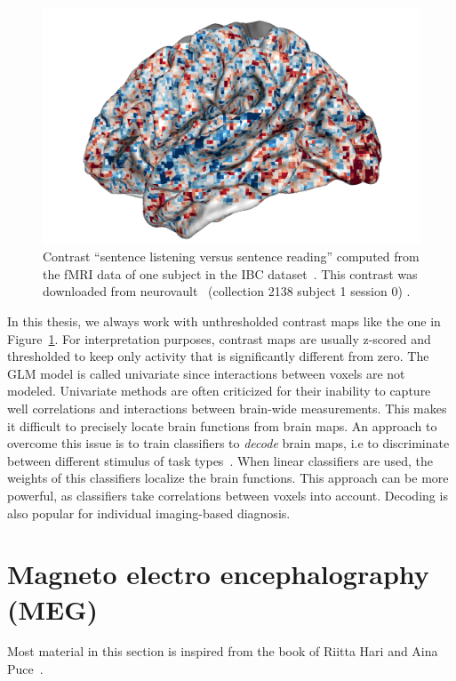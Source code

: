 \begin{figure}
  \includegraphics[scale=0.3]{figures/neuroscience/spatial_map.png}
  \caption{Contrast ``sentence listening versus sentence reading'' computed from the fMRI data of one
    subject in the IBC dataset~\cite{ibc, ibc2}. This contrast was downloaded
    from neurovault~\cite{gorgolewski2015neurovault} (collection 2138 subject 1 session 0) .}
  \label{fig:ibc_contrast}
\end{figure}

In this thesis, we always work with unthresholded contrast maps like the
one in Figure~\ref{fig:ibc_contrast}. For interpretation purposes, contrast maps
are usually z-scored and thresholded to keep only activity that is significantly
different from zero.
The GLM model is called univariate since interactions between voxels are not
modeled.
Univariate methods are often criticized for their inability to
capture well correlations and interactions between brain-wide measurements.
This makes it difficult to precisely locate brain functions from brain maps. An approach to overcome this issue is to train classifiers to \emph{decode} brain maps, i.e to discriminate between different stimulus of task
types~\cite{shirer_decoding_2012,varoquaux_how_2014,loula_decoding_2018}. When linear classifiers are used, the weights of this classifiers localize the brain functions.
This approach can be more powerful, as classifiers take correlations between
voxels into account. Decoding is also popular for individual imaging-based diagnosis.

\section{Magneto electro encephalography (MEG)}
Most material in this section is inspired from the book of Riitta Hari and Aina
Puce~\cite{hari2017meg}.

